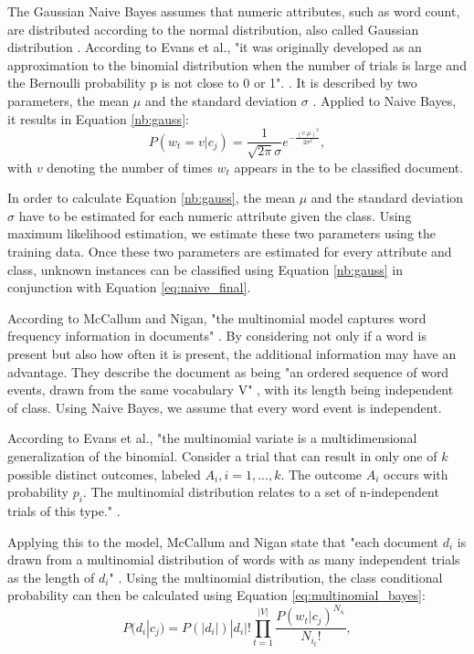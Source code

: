         The Gaussian Naive Bayes assumes that numeric attributes, such as word count, are distributed according to the normal distribution, also called Gaussian distribution \cite{nb_gauss}. According to Evans et al., "it was originally developed as an approximation to the binomial distribution when the number of trials is large and the Bernoulli probability p is not close to 0 or 1". \cite[p.~143]{evans2011statistical}. It is described by two parameters, the mean $\mu$ and the standard deviation $\sigma$ \cite{evans2011statistical}. Applied to Naive Bayes, it results in Equation \eqref{nb:gauss}:
        \begin{equation}
        \label{nb:gauss}
            P(w_t = v|c_j) = \frac{1}{\sqrt{2\pi}\sigma}e^{-\frac{(v.\mu)^2}{2\sigma^2}},
        \end{equation}
        with $v$ denoting the number of times $w_t$ appears in the to be classified document.
        
        In order to calculate Equation \eqref{nb:gauss}, the mean $\mu$ and the standard deviation $\sigma$ have to be estimated for each numeric attribute given the class. Using maximum likelihood estimation, we estimate these two parameters using the training data. Once these two parameters are estimated for every attribute and class, unknown instances can be classified using Equation \eqref{nb:gauss} in conjunction with Equation \eqref{eq:naive_final}.
        
        According to McCallum and Nigan, "the multinomial model captures word frequency information in documents" \cite[p.~3]{Mccallum1998}. By considering not only if a word is present but also how often it is present, the additional information may have an advantage. They describe the document as being "an ordered sequence of word events, drawn from the same vocabulary V" \cite[p.~3]{Mccallum1998}, with its length being independent of class. Using Naive Bayes, we assume that every word event is independent.
        
        According to Evans et al., "the multinomial variate is a multidimensional generalization of the binomial. Consider a trial that can result in only one of $k$ possible distinct outcomes, labeled $A_i, i = 1,...,k$. The outcome $A_i$ occurs with probability $p_i$. The multinomial distribution relates to a set of n-independent trials of this type." \cite[p.~135]{evans2011statistical}.
        
        Applying this to the model, McCallum and Nigan state that "each document $d_i$ is drawn from a multinomial distribution of words with as many independent trials as the length of $d_i$" \cite[p.~3]{Mccallum1998}. Using the multinomial distribution, the class conditional probability can then be calculated using Equation \eqref{eq:multinomial_bayes}:
        \begin{equation}
            \label{eq:multinomial_bayes}
                P(d_i|c_j) = P(|d_i|)|d_i|!\prod_{t=1}^{|V|}\frac{P(w_t|c_j)^{N_{i_t}}}{N_{i_t}!},
        \end{equation}
        
